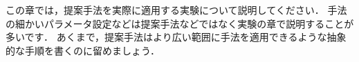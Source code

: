 この章では，提案手法を実際に適用する実験について説明してください．
手法の細かいパラメータ設定などは提案手法などではなく実験の章で説明することが多いです．
あくまで，提案手法はより広い範囲に手法を適用できるような抽象的な手順を書くのに留めましょう．